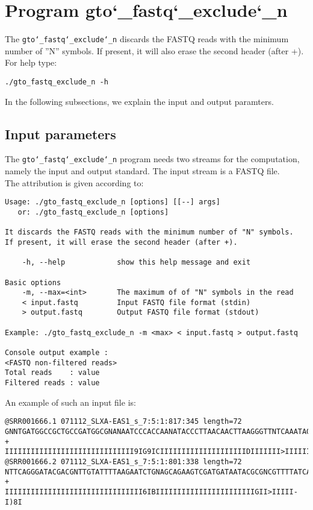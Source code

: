 \section{Program gto\char`_fastq\char`_exclude\char`_n}
The \texttt{gto\char`_fastq\char`_exclude\char`_n} discards the FASTQ reads with the minimum number of ''N'' symbols. If present, it will also erase the second header (after +).\\
For help type:
\begin{lstlisting}
./gto_fastq_exclude_n -h
\end{lstlisting}
In the following subsections, we explain the input and output paramters.

\subsection*{Input parameters}

The \texttt{gto\char`_fastq\char`_exclude\char`_n} program needs two streams for the computation, namely the input and output standard. The input stream is a FASTQ file.\\
The attribution is given according to:
\begin{lstlisting}
Usage: ./gto_fastq_exclude_n [options] [[--] args]
   or: ./gto_fastq_exclude_n [options]

It discards the FASTQ reads with the minimum number of "N" symbols. 
If present, it will erase the second header (after +).

    -h, --help            show this help message and exit

Basic options
    -m, --max=<int>       The maximum of of "N" symbols in the read
    < input.fastq         Input FASTQ file format (stdin)
    > output.fastq        Output FASTQ file format (stdout)

Example: ./gto_fastq_exclude_n -m <max> < input.fastq > output.fastq

Console output example :
<FASTQ non-filtered reads>
Total reads    : value
Filtered reads : value
\end{lstlisting}
An example of such an input file is:
\begin{lstlisting}
@SRR001666.1 071112_SLXA-EAS1_s_7:5:1:817:345 length=72
GNNTGATGGCCGCTGCCGATGGCGNANAATCCCACCAANATACCCTTAACAACTTAAGGGTTNTCAAATAGA
+
IIIIIIIIIIIIIIIIIIIIIIIIIIIIII9IG9ICIIIIIIIIIIIIIIIIIIIIDIIIIIII>IIIIII/
@SRR001666.2 071112_SLXA-EAS1_s_7:5:1:801:338 length=72
NTTCAGGGATACGACGNTTGTATTTTAAGAATCTGNAGCAGAAGTCGATGATAATACGCGNCGTTTTATCAN
+
IIIIIIIIIIIIIIIIIIIIIIIIIIIIIIII6IBIIIIIIIIIIIIIIIIIIIIIIIGII>IIIII-I)8I
\end{lstlisting}

